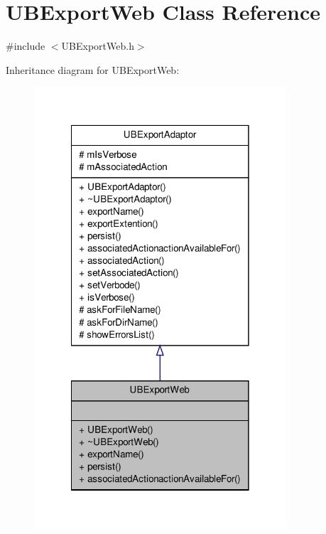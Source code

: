 \hypertarget{class_u_b_export_web}{\section{U\-B\-Export\-Web Class Reference}
\label{de/d67/class_u_b_export_web}
}


{\ttfamily \#include $<$U\-B\-Export\-Web.\-h$>$}



Inheritance diagram for U\-B\-Export\-Web\-:
\nopagebreak
\begin{figure}[H]
\begin{center}
\leavevmode
\includegraphics[width=266pt]{d6/d85/class_u_b_export_web__inherit__graph}
\end{center}
\end{figure}


